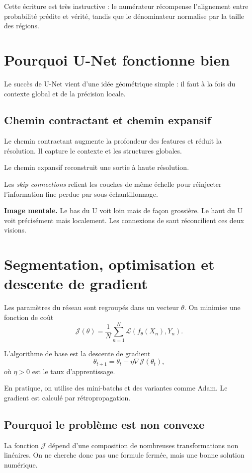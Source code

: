 \documentclass[11pt]{article}
\begin{document}
Cette écriture est très instructive : le numérateur récompense l'alignement entre probabilité prédite et vérité, tandis que le dénominateur normalise par la taille des régions.

\section{Pourquoi U-Net fonctionne bien}
Le succès de U-Net vient d'une idée géométrique simple : il faut à la fois du contexte global et de la précision locale.

\subsection{Chemin contractant et chemin expansif}
Le chemin contractant augmente la profondeur des features et réduit la résolution. Il capture le contexte et les structures globales.

Le chemin expansif reconstruit une sortie à haute résolution.

Les \emph{skip connections} relient les couches de même échelle pour réinjecter l'information fine perdue par sous-échantillonnage.

\begin{ideaBox}
\textbf{Image mentale.} Le bas du U voit loin mais de façon grossière. Le haut du U voit précisément mais localement. Les connexions de saut réconcilient ces deux visions.
\end{ideaBox}

\section{Segmentation, optimisation et descente de gradient}
Les paramètres du réseau sont regroupés dans un vecteur $\theta$. On minimise une fonction de coût
\[
\mathcal{J}(\theta)=\frac{1}{N}\sum_{n=1}^N \mathcal{L}(f_\theta(X_n),Y_n).
\]

L'algorithme de base est la descente de gradient
\[
\theta_{t+1}=\theta_t-\eta\nabla \mathcal{J}(\theta_t),
\]
où $\eta>0$ est le taux d'apprentissage.

En pratique, on utilise des mini-batchs et des variantes comme Adam. Le gradient est calculé par rétropropagation.

\subsection{Pourquoi le problème est non convexe}
La fonction $\mathcal{J}$ dépend d'une composition de nombreuses transformations non linéaires. On ne cherche donc pas une formule fermée, mais une bonne solution numérique.
\end{document}

